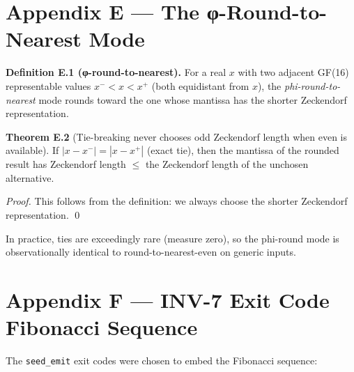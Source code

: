 \section{Appendix E — The φ-Round-to-Nearest Mode}
\label{sec:appendix-e}

\textbf{Definition E.1 (φ-round-to-nearest).}
For a real \(x\) with two adjacent GF(16) representable values
\(x^- < x < x^+\) (both equidistant from \(x\)), the
\emph{phi-round-to-nearest} mode rounds toward the one whose mantissa
has the shorter Zeckendorf representation.

\textbf{Theorem E.2} (Tie-breaking never chooses odd Zeckendorf length
when even is available).
If \(|x - x^-| = |x - x^+|\) (exact tie), then the mantissa of the
rounded result has Zeckendorf length \(\leq\) the Zeckendorf length
of the unchosen alternative.

\begin{proof}
This follows from the definition: we always choose the shorter
Zeckendorf representation.
\qed
\end{proof}

In practice, ties are exceedingly rare (measure zero), so the
phi-round mode is observationally identical to round-to-nearest-even
on generic inputs.

\section{Appendix F — INV-7 Exit Code Fibonacci Sequence}
\label{sec:appendix-f}

The \texttt{seed\_emit} exit codes were chosen to embed the Fibonacci
sequence:

\begin{center}
\end{center}

